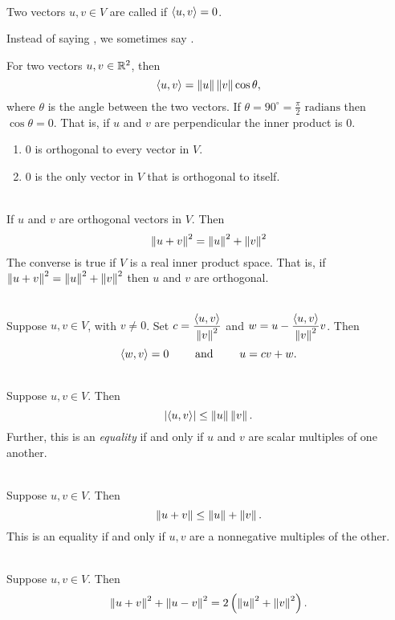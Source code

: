 \\Two vectors $u,v \in V$ are called  if $\left\langle{u,v}\right\rangle = 0$.

\nl Instead of saying , we sometimes say .

\nl For two vectors $u,v \in \mathbb{R}^2$, then $$\left\langle{u,v}\right\rangle = \left\| {u} \right\|\left\| {v} \right\|\cos \theta,$$
where $\theta$ is the angle between the two vectors. If $\theta = 90^{\circ} = \frac{\pi}{2} \text{ radians}$ then $\cos \theta = 0$. That is, if $u$ and $v$ are perpendicular the inner product is 0.

\begin{enumerate}[label=(\alph*)]
    \item 0 is orthogonal to every vector in $V$.
    \item 0 is the only vector in $V$ that is orthogonal to itself.
\end{enumerate}

 \\ If $u$ and $v$ are orthogonal vectors in $V$. Then
$$\left\| {u + v} \right\|^2 = \left\| {u} \right\|^2 + \left\| {v} \right\|^2$$
The converse is true if $V$ is a real inner product space. That is, if $\left\| {u + v} \right\|^2 = \left\| {u} \right\|^2 + \left\| {v} \right\|^2$ then $u$ and $v$ are orthogonal.

\\Suppose $u,v \in V$, with $v \neq 0$. Set $c = \dfrac{\left\langle{u,v}\right\rangle}{\left\| {v} \right\|^2}$ and $w = u - \dfrac{\left\langle{u,v}\right\rangle}{\left\| {v} \right\|^2}v$. Then 
$$\left\langle{w,v}\right\rangle = 0 \qquad \text{ and } \qquad u = cv + w.$$

\\
Suppose $u,v\in V$. Then
$$\left| {\left\langle{u,v}\right\rangle} \right| \leq \left\| {u} \right\| \left\| {v} \right\|.$$
Further, this is an \textit{equality} if and only if $u$ and $v$ are scalar multiples of one another. 

\\
Suppose $u,v \in V$. Then 
$$\left\| {u+v} \right\|\leq \left\| {u} \right\| + \left\| {v} \right\|.$$
This is an equality if and only if $u,v$ are a nonnegative multiples of the other.

\\Suppose $u,v \in V$. Then $$\left\| {u+v} \right\|^2 + \left\| {u-v} \right\|^2 = 2 \left( {\left\| {u} \right\|^2 + \left\| {v} \right\|^2} \right).$$
